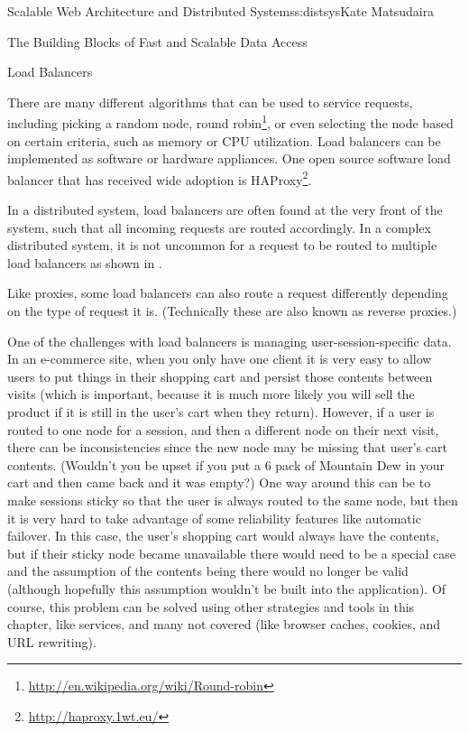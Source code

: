\begin{aosachapter}{Scalable Web Architecture and Distributed Systems}{s:distsys}{Kate Matsudaira}
\begin{aosasect1}{The Building Blocks of Fast and Scalable Data Access}
\begin{aosasect2}{Load Balancers}

There are many different algorithms that can be used to service
requests, including picking a random node, round robin\footnote{\url{http://en.wikipedia.org/wiki/Round-robin}}, or even selecting the node
based on certain criteria, such as memory or CPU utilization. Load balancers can
be implemented as software or hardware appliances. One open source
software load balancer that has received wide adoption is
HAProxy\footnote{\url{http://haproxy.1wt.eu/}}.

In a distributed system, load balancers are often found at the very
front of the system, such that all incoming requests are routed
accordingly. In a complex distributed system, it is not uncommon for a
request to be routed to multiple load balancers as shown in 
.


Like proxies, some load balancers can also route a request
differently depending on the type of request it is. (Technically these are
also known as reverse proxies.)

One of the challenges with load balancers is managing user-session-specific 
data. In an e-commerce site, when you only have one client it
is very easy to allow users to put things in their shopping cart and
persist those contents between visits (which is important, because it
is much more likely you will sell the product if it is still in the
user's cart when they return). However, if a user is routed to one
node for a session, and then a different node on their next visit,
there can be inconsistencies since the new node may be missing that
user's cart contents. (Wouldn't you be upset if you put a 6 pack of
Mountain Dew in your cart and then came back and it was empty?) One way
around this can be to make sessions sticky so that the user is always
routed to the same node, but then it is very hard to take advantage of
some reliability features like automatic failover. In this case, the
user's shopping cart would always have the contents, but if their
sticky node became unavailable there would need to be a special case
and the assumption of the contents being there would no longer be
valid (although hopefully this assumption wouldn't be built into the
application). Of course, this problem can be solved using other
strategies and tools in this chapter, like services, and many not
covered (like browser caches, cookies, and URL rewriting).


\end{aosasect2}
\end{aosasect1}
\end{aosachapter}
